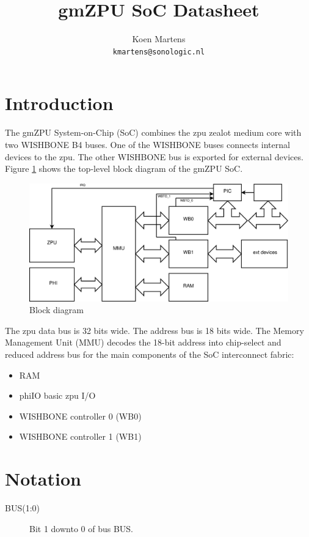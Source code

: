 \documentclass[a4paper,twocolumn,12pt]{article}
\title{gmZPU SoC Datasheet}
\author{Koen Martens\\
        \texttt{kmartens@sonologic.nl}}
\begin{document}
\maketitle

\section{Introduction}

The gmZPU System-on-Chip (SoC) combines the zpu zealot medium core \cite{zpu} with two WISHBONE B4 \cite{wishbone} buses. One of the WISHBONE buses connects internal devices to the zpu. The other WISHBONE bus is exported for external devices. Figure \ref{fig:block_diagram} shows the top-level block diagram of the gmZPU SoC.

\begin{figure}
    \centering
    \includegraphics[width=15cm]{gmzpu_block_diagram}
    \caption{Block diagram}
    \label{fig:block_diagram}
\end{figure}

The zpu data bus is 32 bits wide. The address bus is 18 bits wide. The Memory Management Unit (MMU) decodes the 18-bit address into chip-select and reduced address bus for the main components of the SoC interconnect fabric:

\begin{itemize}
    \item RAM
    \item phiIO basic zpu I/O
    \item WISHBONE controller 0 (WB0)
    \item WISHBONE controller 1 (WB1)
\end{itemize}

\section{Notation}

\begin{description}
    \item[BUS(1:0)] Bit 1 downto 0 of bus BUS.
\end{description}
\end{document}
